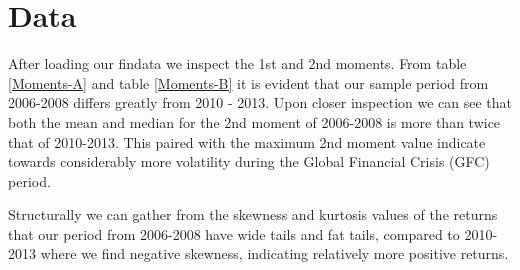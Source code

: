 \documentclass[11pt,preprint, authoryear]{elsarticle}
\numberwithin{equation}{section}
\numberwithin{figure}{section}
\numberwithin{table}{section}
\begin{document}
\section{\texorpdfstring{Data \label{Data}}{Data }}\label{data}

After loading our findata we inspect the 1st and 2nd moments. From table
\ref{Moments-A} and table \ref{Moments-B} it is evident that our sample
period from 2006-2008 differs greatly from 2010 - 2013. Upon closer
inspection we can see that both the mean and median for the 2nd moment
of 2006-2008 is more than twice that of 2010-2013. This paired with the
maximum 2nd moment value indicate towards considerably more volatility
during the Global Financial Crisis (GFC) period.

Structurally we can gather from the skewness and kurtosis values of the
returns that our period from 2006-2008 have wide tails and fat tails,
compared to 2010-2013 where we find negative skewness, indicating
relatively more positive returns.
\end{document}
